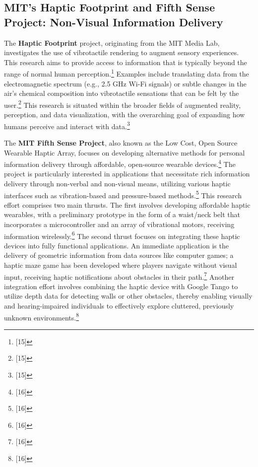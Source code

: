 \subsection{MIT's Haptic Footprint and Fifth Sense Project: Non-Visual Information Delivery}
The \textbf{Haptic Footprint} project, originating from the MIT Media Lab, investigates the use of vibrotactile rendering to augment sensory experiences. This research aims to provide access to information that is typically beyond the range of normal human perception.\footnote{[15]} Examples include translating data from the electromagnetic spectrum (e.g., 2.5 GHz Wi-Fi signals) or subtle changes in the air's chemical composition into vibrotactile sensations that can be felt by the user.\footnote{[15]} This research is situated within the broader fields of augmented reality, perception, and data visualization, with the overarching goal of expanding how humans perceive and interact with data.\footnote{[15]}

The \textbf{MIT Fifth Sense Project}, also known as the Low Cost, Open Source Wearable Haptic Array, focuses on developing alternative methods for personal information delivery through affordable, open-source wearable devices.\footnote{[16]} The project is particularly interested in applications that necessitate rich information delivery through non-verbal and non-visual means, utilizing various haptic interfaces such as vibration-based and pressure-based methods.\footnote{[16]} This research effort comprises two main thrusts. The first involves developing affordable haptic wearables, with a preliminary prototype in the form of a waist/neck belt that incorporates a microcontroller and an array of vibrational motors, receiving information wirelessly.\footnote{[16]} The second thrust focuses on integrating these haptic devices into fully functional applications. An immediate application is the delivery of geometric information from data sources like computer games; a haptic maze game has been developed where players navigate without visual input, receiving haptic notifications about obstacles in their path.\footnote{[16]} Another integration effort involves combining the haptic device with Google Tango to utilize depth data for detecting walls or other obstacles, thereby enabling visually and hearing-impaired individuals to effectively explore cluttered, previously unknown environments.\footnote{[16]}

